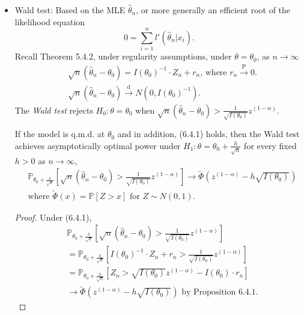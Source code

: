 \documentclass[a4paper]{article}
\begin{document}
\begin{itemize}[leftmargin=*]
	\item Wald test: Based on the MLE $\hat{\theta}_n$, or more generally an efficient root of the likelihood equation
	\begin{equation*}
		0 = \sum\limits_{i=1}^n l'(\hat{\theta}_n | x_i).
	\end{equation*}
	Recall Theorem 5.4.2, under regularity assumptions, under $\theta = \theta_0$, as $n \to \infty$
	\begin{equation}
		\begin{aligned}
			& \sqrt{n}(\hat{\theta}_n - \theta_0) = I(\theta_0)^{-1} \cdot Z_n + r_n \text{, where } r_n \stackrel{\text{P}}{\longrightarrow} 0. \\
			& \sqrt{n}(\hat{\theta}_n - \theta_0) \stackrel{\text{d}}{\longrightarrow} N(0,I(\theta_0)^{-1}).
		\end{aligned}
	\end{equation}
	The \emph{Wald test} rejects $H_0: \theta = \theta_0$ when $\sqrt{n}(\hat{\theta}_n - \theta_0) > \frac{1}{\sqrt{I(\theta_0)}} z^{(1-\alpha)}$.
	\begin{prop}
		If the model is q.m.d. at $\theta_0$ and in addition, (6.4.1) holds, then the Wald test achieves asymptotically optimal power under $H_1: \theta = \theta_0 + \frac{h}{\sqrt{n}}$ for every fixed $h > 0$ as $n \to \infty$,
		\begin{equation*}
			\begin{aligned}
				& \mathbb{P}_{\theta_0+\frac{h}{\sqrt{n}}} \left[\sqrt{n}(\hat{\theta}_n - \theta_0) > \frac{1}{\sqrt{I(\theta_0)}} z^{(1-\alpha)}\right] \to \tilde{\Phi}(z^{(1-\alpha)} - h \sqrt{I(\theta_0)}) \\
				& \text{where  $\tilde{\Phi}(x) = \mathbb{P}[Z > x]$ for $Z \sim N(0,1)$.}
			\end{aligned}
		\end{equation*} 
	\end{prop}
	
	\begin{proof}
		Under (6.4.1),
		\begin{equation*}
			\begin{aligned}
				& \mathbb{P}_{\theta_0+\frac{h}{\sqrt{n}}} \left[\sqrt{n} (\hat{\theta}_n - \theta_0) > \frac{1}{\sqrt{I(\theta_0)}} z^{(1-\alpha)} \right] \\
				&= \mathbb{P}_{\theta_0+\frac{h}{\sqrt{n}}} \left[I(\theta_0)^{-1} \cdot Z_n + r_n > \frac{1}{\sqrt{I(\theta_0)}} z^{(1-\alpha)} \right] \\
				&= \mathbb{P}_{\theta_0+\frac{h}{\sqrt{n}}} \left[Z_n > \sqrt{I(\theta_0)} z^{(1-\alpha)} - I(\theta_0) \cdot r_n \right] \\
				&\to \tilde{\Phi}\left(z^{(1-\alpha)} - h \sqrt{I(\theta_0)} \right) \text{ by Proposition 6.4.1}.
			\end{aligned}
		\end{equation*}
	\end{proof}
\end{itemize}
\end{document}
